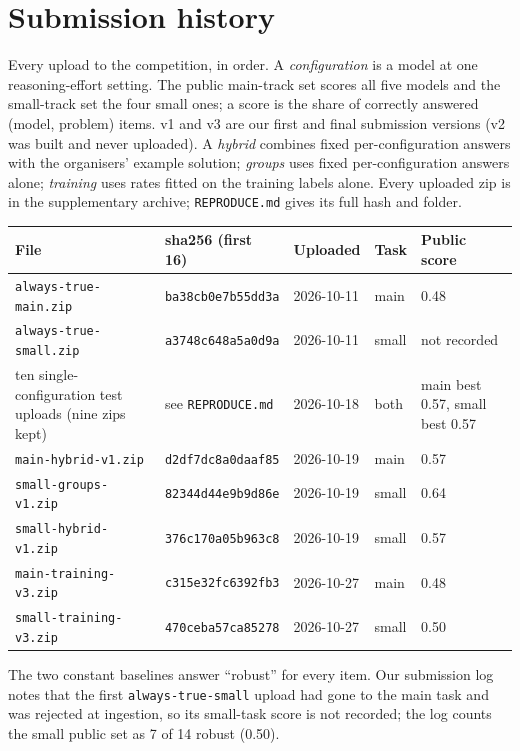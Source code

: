 \documentclass{article}
\begin{document}
\appendix
\section{Submission history}

Every upload to the competition, in order. A \emph{configuration} is a model at one reasoning-effort setting. The public main-track set scores all five models and the small-track set the four small ones; a score is the share of correctly answered (model, problem) items. v1 and v3 are our first and final submission versions (v2 was built and never uploaded). A \emph{hybrid} combines fixed per-configuration answers with the organisers' example solution; \emph{groups} uses fixed per-configuration answers alone; \emph{training} uses rates fitted on the training labels alone. Every uploaded zip is in the supplementary archive; \texttt{REPRODUCE.md} gives its full hash and folder.

\begin{center}
\footnotesize\setlength{\tabcolsep}{4pt}
\begin{tabular}{@{}p{3.9cm}p{2.9cm}p{1.9cm}p{1.0cm}p{2.1cm}@{}}
\toprule
File & sha256 (first 16) & Uploaded & Task & Public score \\
\midrule
\texttt{always-true-main.zip} & \texttt{ba38cb0e7b55dd3a} & 2026-10-11 & main & 0.48 \\
\texttt{always-true-small.zip} & \texttt{a3748c648a5a0d9a} & 2026-10-11 & small & not recorded \\
ten single-configuration test uploads (nine zips kept) & see \texttt{REPRODUCE.md} & 2026-10-18 & both & main best 0.57, small best 0.57 \\
\texttt{main-hybrid-v1.zip} & \texttt{d2df7dc8a0daaf85} & 2026-10-19 & main & 0.57 \\
\texttt{small-groups-v1.zip} & \texttt{82344d44e9b9d86e} & 2026-10-19 & small & 0.64 \\
\texttt{small-hybrid-v1.zip} & \texttt{376c170a05b963c8} & 2026-10-19 & small & 0.57 \\
\texttt{main-training-v3.zip} & \texttt{c315e32fc6392fb3} & 2026-10-27 & main & 0.48 \\
\texttt{small-training-v3.zip} & \texttt{470ceba57ca85278} & 2026-10-27 & small & 0.50 \\
\bottomrule
\end{tabular}
\end{center}

The two constant baselines answer ``robust'' for every item. Our submission log notes that the
first \texttt{always-true-small} upload had gone to the main task and was rejected at ingestion, so
its small-task score is not recorded; the log counts the small public set as 7 of 14 robust (0.50).
\end{document}
